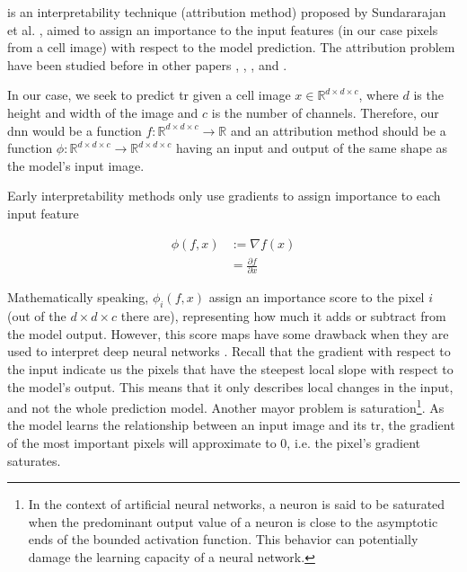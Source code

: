 
\glsresetall

\graphicspath{{./Sections/Basics/Resources/}}

 is an interpretability technique (attribution method) proposed by Sundararajan et al. \cite{sundararajan2017axiomatic}, aimed to assign an importance to the input features (in our case pixels from a cell image) with respect to the model prediction. The attribution problem have been studied before in other papers \cite{JMLR:v11:baehrens10a}, \cite{SimonyanVZ13}, \cite{ShrikumarGSK16}, \cite{BinderMBMS16} and \cite{Springenberg}.

In our case, we seek to predict \gls{tr} given a cell image $x \in \mathbb{R}^{d \times d \times c}$, where $d$ is the height and width of the image and $c$ is the number of channels.
Therefore, our \gls{dnn} would be a function $f:\mathbb{R}^{d \times d \times c} \rightarrow \mathbb{R}$ and an attribution method should be a function $\phi:\mathbb{R}^{d \times d \times c} \rightarrow \mathbb{R}^{d \times d \times c}$ having an input and output of the same shape as the model's input image.

Early interpretability methods only use gradients to assign importance to each input feature

\begin{equation}
  \begin{split}
    \phi(f,x) &:= \nabla f(x) \\
    &= \frac{\partial f}{\partial x}
  \end{split}
\end{equation}

Mathematically speaking, $\phi_i(f,x)$ assign an importance score to the pixel $i$ (out of the $d \times d \times c$ there are), representing how much it adds or subtract from the model output.
However, this score maps have some drawback when they are used to interpret deep neural networks \cite{sturmfels2020visualizing}. Recall that the gradient with respect to the input indicate us the pixels that have the steepest local slope with respect to the model's output.
This means that it only describes local changes in the input, and not the whole prediction model. Another mayor problem is saturation\footnote{In the context of artificial neural networks, a neuron is said to be saturated when the predominant output value of a neuron is close to the asymptotic ends of the bounded activation function. This behavior can potentially damage the learning capacity of a neural network.}.
As the model learns the relationship between an input image and its \gls{tr}, the gradient of the most important pixels will approximate to 0, i.e. the pixel's gradient saturates.


